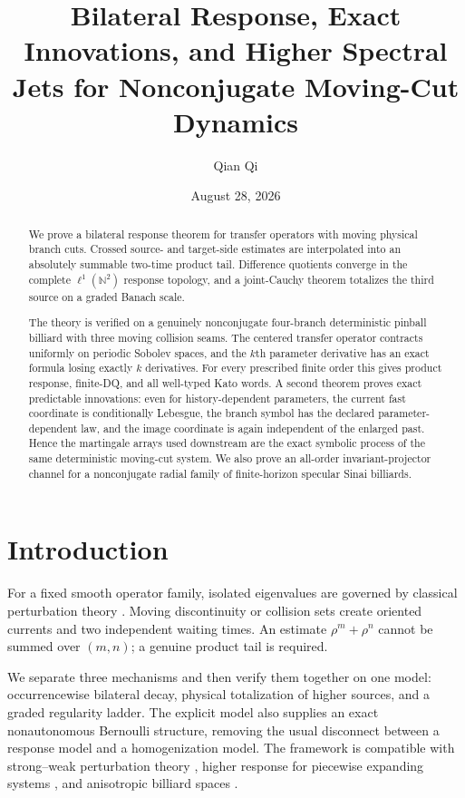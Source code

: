 \documentclass[11pt,reqno]{amsart}
\title[Bilateral response and exact innovations]{Bilateral Response, Exact Innovations, and Higher Spectral Jets for Nonconjugate Moving-Cut Dynamics}
\author{Qian Qi}
\date{August 28, 2026}
\theoremstyle{definition}
\theoremstyle{remark}
\newcommand{\N}{\mathbb N}
\begin{document}
\begin{abstract}
We prove a bilateral response theorem for transfer operators with moving
physical branch cuts.  Crossed source- and target-side estimates are
interpolated into an absolutely summable two-time product tail.  Difference
quotients converge in the complete $\ell^1(\N^2)$ response topology, and a
joint-Cauchy theorem totalizes the third source on a graded Banach scale.

The theory is verified on a genuinely nonconjugate four-branch deterministic
pinball billiard with three moving collision seams.  The centered transfer
operator contracts uniformly on periodic Sobolev spaces, and the $k$th
parameter derivative has an exact formula losing exactly $k$ derivatives.
For every prescribed finite order this gives product response, finite-DQ,
and all well-typed Kato words.  A second theorem proves exact predictable
innovations: even for history-dependent parameters, the current fast
coordinate is conditionally Lebesgue, the branch symbol has the declared
parameter-dependent law, and the image coordinate is again independent of the
enlarged past.  Hence the martingale arrays used downstream are the exact
symbolic process of the same deterministic moving-cut system.  We also prove
an all-order invariant-projector channel for a nonconjugate radial family of
finite-horizon specular Sinai billiards.
\end{abstract}
\maketitle
\tableofcontents

\section{Introduction}
For a fixed smooth operator family, isolated eigenvalues are governed by
classical perturbation theory \cite{Kato1995}.  Moving discontinuity or
collision sets create oriented currents and two independent waiting times.
An estimate $\rho^m+\rho^n$ cannot be summed over $(m,n)$; a genuine product
tail is required.

We separate three mechanisms and then verify them together on one model:
occurrencewise bilateral decay, physical totalization of higher sources, and a
graded regularity ladder.  The explicit model also supplies an exact
nonautonomous Bernoulli structure, removing the usual disconnect between a
response model and a homogenization model.  The framework is compatible with
strong--weak perturbation theory \cite{KellerLiverani1999}, higher response for
piecewise expanding systems \cite{BaladiSmania2008}, and anisotropic billiard
spaces \cite{DemersLiverani2008,BaladiDemersLiverani2018}.
\end{document}
